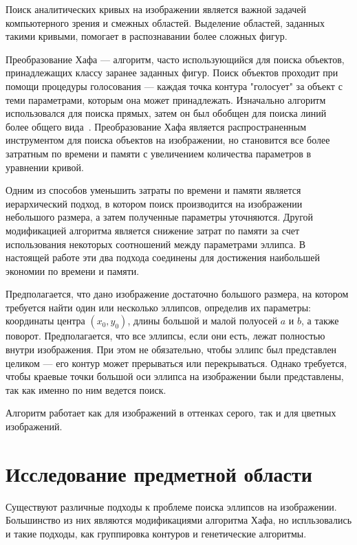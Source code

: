 






\tableofcontents
\clearpage

\Intro
Поиск аналитических кривых на изображении является важной задачей компьютерного зрения и смежных областей. Выделение областей, заданных такими кривыми, помогает в распознавании более сложных фигур.

Преобразование Хафа --- алгоритм, часто использующийся для поиска объектов, принадлежащих классу заранее заданных фигур. 
Поиск объектов проходит при помощи процедуры голосования --- каждая точка контура "голосует" за объект с теми параметрами, которым она может принадлежать. 
Изначально алгоритм использовался для поиска прямых, затем он был обобщен для поиска линий более общего вида~\autocite{Duda}.
Преобразование Хафа является распространенным инструментом для поиска объектов на изображении, но становится все более затратным по времени и памяти с увеличением количества параметров в уравнении кривой.

Одним из способов уменьшить затраты по времени и памяти является иерархический подход, в котором поиск производится на изображении небольшого размера, а затем полученные параметры уточняются. 
Другой модификацией алгоритма является снижение затрат по памяти за счет использования некоторых соотношений между параметрами эллипса.
В настоящей работе эти два подхода соединены для достижения наибольшей экономии по времени и памяти.

Предполагается, что дано изображение достаточно большого размера, на котором требуется найти один или несколько эллипсов, определив их параметры: 
координаты центра \((x_0, y_0)\), длины большой и малой полуосей \(a\) и \(b\), а также поворот. Предполагается, что все эллипсы, если они есть, лежат 
полностью внутри изображения. При этом не обязательно, чтобы эллипс был представлен целиком --- его контур может прерываться или перекрываться. 
Однако требуется, чтобы краевые точки большой оси эллипса на изображении были представлены, так как именно по ним ведется поиск.  

Алгоритм работает как для изображений в оттенках серого, так и для цветных изображений.

\section{Исследование предметной области}
Существуют различные подходы к проблеме поиска эллипсов на изображении.  Большинство из них являются модификациями алгоритма Хафа, 
но испльзовались и такие подходы, как группировка контуров и генетические алгоритмы.

